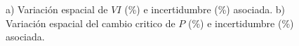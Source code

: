\begin{figure}[htb]
\centering
  \hfill
  \hfill
 \caption{a) Variación espacial de $VI$ (\%) e incertidumbre (\%) asociada. b) Variación espacial del cambio critico de $P$ (\%) e incertidumbre (\%) asociada.}
 \label{fig:13_14figs}
\end{figure}
